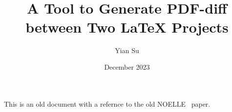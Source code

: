 \documentclass[12pt, letterpaper]{article}
\title{A Tool to Generate PDF-diff between Two \LaTeX{} Projects}
\author{Yian Su}
\date{December 2023}
\begin{document}
\maketitle

This is an old document with a refernce to the old NOELLE~\cite{noelle:arxiv} paper.



\end{document}
